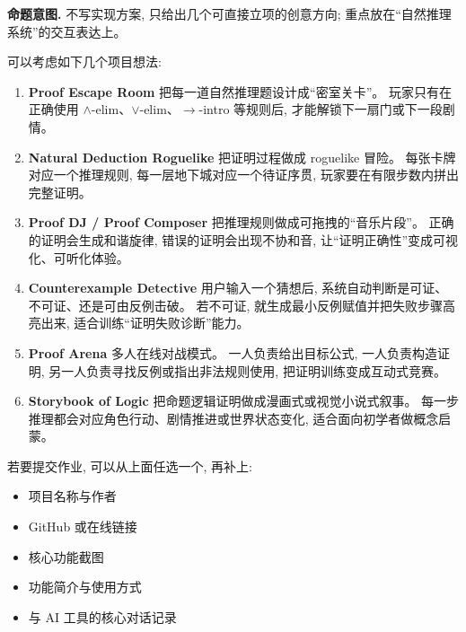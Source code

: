 \documentclass[a4paper, justified]{tufte-handout}
\newenvironment{intention}
  {\par\smallskip\noindent\textbf{命题意图. }\ignorespaces}
  {\par\smallskip}
\begin{document}
\begin{solution}
  \begin{intention}
    不写实现方案, 只给出几个可直接立项的创意方向; 重点放在“自然推理系统”的交互表达上。
  \end{intention}

  可以考虑如下几个项目想法:

  \begin{enumerate}[(1)]
    \item \textbf{Proof Escape Room}
      把每一道自然推理题设计成“密室关卡”。
      玩家只有在正确使用 $\land$-elim、$\lor$-elim、$\to$-intro 等规则后,
      才能解锁下一扇门或下一段剧情。

    \item \textbf{Natural Deduction Roguelike}
      把证明过程做成 roguelike 冒险。
      每张卡牌对应一个推理规则, 每一层地下城对应一个待证序贯,
      玩家要在有限步数内拼出完整证明。

    \item \textbf{Proof DJ / Proof Composer}
      把推理规则做成可拖拽的“音乐片段”。
      正确的证明会生成和谐旋律, 错误的证明会出现不协和音,
      让“证明正确性”变成可视化、可听化体验。

    \item \textbf{Counterexample Detective}
      用户输入一个猜想后, 系统自动判断是可证、不可证、还是可由反例击破。
      若不可证, 就生成最小反例赋值并把失败步骤高亮出来,
      适合训练“证明失败诊断”能力。

    \item \textbf{Proof Arena}
      多人在线对战模式。
      一人负责给出目标公式, 一人负责构造证明, 另一人负责寻找反例或指出非法规则使用,
      把证明训练变成互动式竞赛。

    \item \textbf{Storybook of Logic}
      把命题逻辑证明做成漫画式或视觉小说式叙事。
      每一步推理都会对应角色行动、剧情推进或世界状态变化,
      适合面向初学者做概念启蒙。
  \end{enumerate}

  若要提交作业, 可以从上面任选一个, 再补上:
  \begin{itemize}
    \item 项目名称与作者
    \item GitHub 或在线链接
    \item 核心功能截图
    \item 功能简介与使用方式
    \item 与 AI 工具的核心对话记录
  \end{itemize}


\end{solution}
\end{document}
